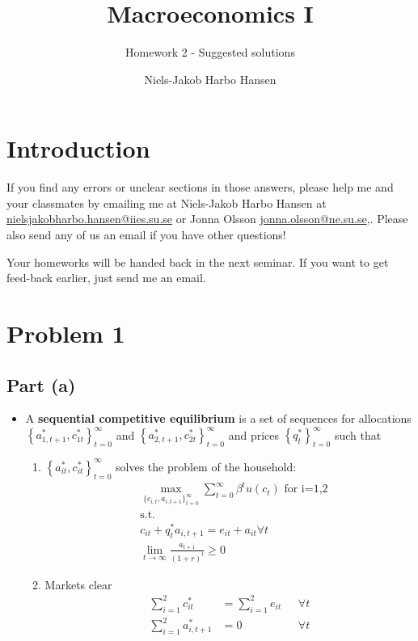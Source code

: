 \documentclass{scrartcl}
\begin{document}
\pagestyle{fancy}
\fancyhead{}
\fancyhead[LE,RO]{\thepage}
\fancyfoot{}

\title{Macroeconomics I}
\subtitle{Homework 2 - Suggested solutions}
\author{Niels-Jakob Harbo Hansen}
\maketitle

\section*{Introduction}
If you find any errors or unclear sections in those answers, please help me and your classmates by emailing me at Niels-Jakob Harbo Hansen at \url{nielsjakobharbo.hansen@iies.su.se} or Jonna Olsson \url{jonna.olsson@ne.su.se},. Please also send any of us an email if you have other questions! 

Your homeworks will be handed back in the next seminar. If you want to get feed-back earlier, just send me an email. 

\section*{Problem 1}

\subsection*{Part (a)}

\begin{itemize}
\item A \textbf{sequential competitive equilibrium} is a set of sequences for allocations $\left\{a_{1,t+1}^*, c_{1t}^*\right\}_{t=0}^{\infty}$ and $\left\{a_{2,t+1}^*, c_{2t}^*\right\}_{t=0}^{\infty}$ and prices $\left\{q_{t}^*\right\}_{t=0}^{\infty}$ such that 
	
	\begin{enumerate}
		\item $\left\{a_{it}^*, c_{it}^*\right\}_{t=0}^{\infty}$ solves the problem of the household:
		\begin{align}
		&\max_{\{{c_{i,t}, a_{i,t+1}}\}_{t=0}^{\infty}} {\sum_{t=0}^{\infty} \beta^t u(c_t)} \text{ for i=1,2}\\
		&\text{s.t. } \nonumber \\ 
		&c_{it}+q_t^* a_{i,t+1}=e_{it}+a_{it} \forall t \nonumber \\
		& \lim_{t \rightarrow \infty} \frac{a_{t+1}}{(1+r)^t} \geq 0 \nonumber 
		\end{align}
		\item Markets clear
		\begin{align}
		\sum_{i=1}^{2} c_{it}^*&=\sum_{i=1}^{2} e_{it} \text{ } &\forall t \\
		\sum_{i=1}^{2} a_{i,t+1}^*&=0 \text{ } &\forall t 
		\end{align}
	\end{enumerate}
	
\end{itemize}
\end{document}
